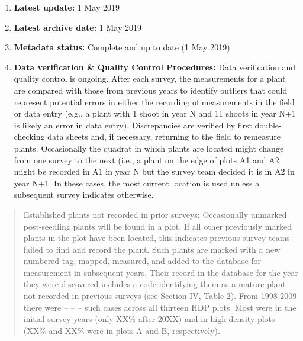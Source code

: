 \documentclass[
  english,
  man]{apa6}
\begin{document}
\begin{enumerate}
\def\labelenumi{\arabic{enumi}.}
\item
  \textbf{Latest update:} 1 May 2019
\item
  \textbf{Latest archive date:} 1 May 2019
\item
  \textbf{Metadata status:} Complete and up to date (1 May 2019)
\item
  \textbf{Data verification \& Quality Control Procedures:} Data
  verification and quality control is ongoing. After each survey, the
  measurements for a plant are compared with those from previous years
  to identify outliers that could represent potential errors in either
  the recording of measurements in the field or data entry (e.g., a
  plant with 1 shoot in year N and 11 shoots in year N+1 is likely an
  error in data entry). Discrepancies are verified by first
  double-checking data sheets and, if necessary, returning to the
  field to remeasure plants. Occasionally the quadrat in which plants
  are located might change from one survey to the next (i.e., a plant
  on the edge of plots A1 and A2 might be recorded in A1 in year N but
  the survey team decided it is in A2 in year N+1. In these cases, the
  most current location is used unless a subsequent survey indicates
  otherwise.
\end{enumerate}

\begin{quote}
Established plants not recorded in prior surveys: Occasionally
unmarked post-seedling plants will be found in a plot. If all other
previously marked plants in the plot have been located, this indicates
previous survey teams failed to find and record the plant. Such plants
are marked with a new numbered tag, mapped, measured, and added to the
database for measurement in subsequent years. Their record in the
database for the year they were discovered includes a code identifying
them as a mature plant not recorded in previous surveys (see Section
IV, Table 2). From 1998-2009 there were -- -- -- such cases across all
thirteen HDP plots. Most were in the initial survey years (only XX\%
after 20XX) and in high-density plots (XX\% and XX\% were in plots A and
B, respectively).
\end{quote}
\end{document}
